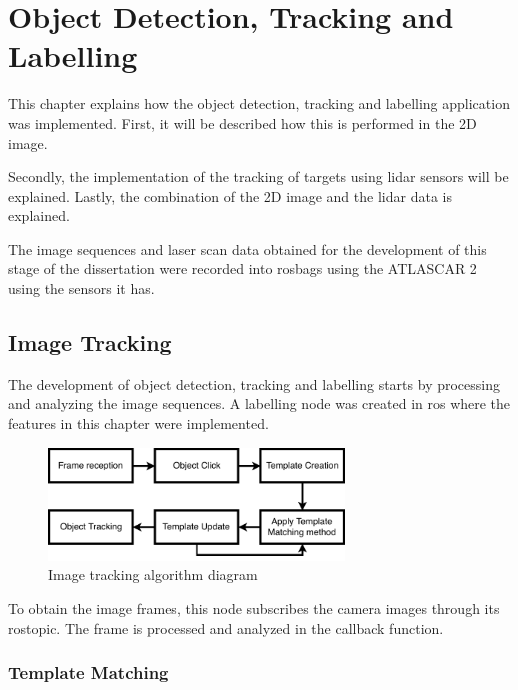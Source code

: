 \chapter{Object Detection, Tracking and Labelling}

This chapter explains how the object detection, tracking and labelling application was implemented. First, it will be described how this is performed in the 2D image. 

Secondly, the implementation of the tracking of targets using \gls{lidar} sensors will be explained. Lastly, the combination of the 2D image and the \gls{lidar} data is explained.

The image sequences and laser scan data obtained for the development of this stage of the dissertation were recorded into rosbags using the ATLASCAR 2 using the sensors it has.

\section{Image Tracking}

The development of object detection, tracking and labelling starts by processing and analyzing the image sequences. A labelling node was created in \gls{ros} where the features in this chapter were implemented. 

\begin{figure}[htp]
	
	\centering
	\includegraphics[width=0.7\textwidth]{caplabel/imgs/templatediagram.pdf}
	
	\caption{Image tracking algorithm diagram}
	\label{fig:view}
	
\end{figure}

To obtain the image frames, this node subscribes the camera images through its rostopic. The frame is processed and analyzed in the callback function.

\subsection{Template Matching}

